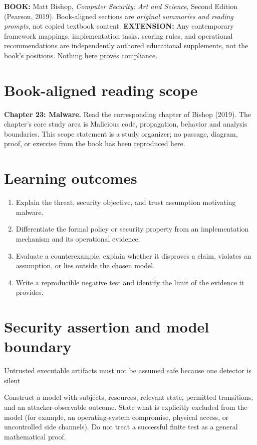 \documentclass[10pt,letterpaper]{article}
\begin{document}
\makedoctocpage
\begin{notebox}
\textbf{BOOK:} Matt Bishop, \emph{Computer Security: Art and Science}, Second Edition (Pearson, 2019). Book-aligned sections are \emph{original summaries and reading prompts}, not copied textbook content.
\textbf{EXTENSION:} Any contemporary framework mappings, implementation tasks, scoring rules, and operational recommendations are independently authored educational supplements, not the book's positions. Nothing here proves compliance.
\end{notebox}
\section{Book-aligned reading scope}
\textbf{Chapter 23: Malware.} Read the corresponding chapter of Bishop (2019). The chapter's core study area is Malicious code, propagation, behavior and analysis boundaries. This scope statement is a study organizer; no passage, diagram, proof, or exercise from the book has been reproduced here.
\section{Learning outcomes}
\begin{enumerate}
\item Explain the threat, security objective, and trust assumption motivating malware.
\item Differentiate the formal policy or security property from an implementation mechanism and its operational evidence.
\item Evaluate a counterexample; explain whether it disproves a claim, violates an assumption, or lies outside the chosen model.
\item Write a reproducible negative test and identify the limit of the evidence it provides.
\end{enumerate}
\section{Security assertion and model boundary}
\begin{infobox}
Untrusted executable artifacts must not be assumed safe because one detector is silent
\end{infobox}
Construct a model with subjects, resources, relevant state, permitted transitions, and an attacker-observable outcome. State what is explicitly excluded from the model (for example, an operating-system compromise, physical access, or uncontrolled side channels). Do not treat a successful finite test as a general mathematical proof.
\end{document}

